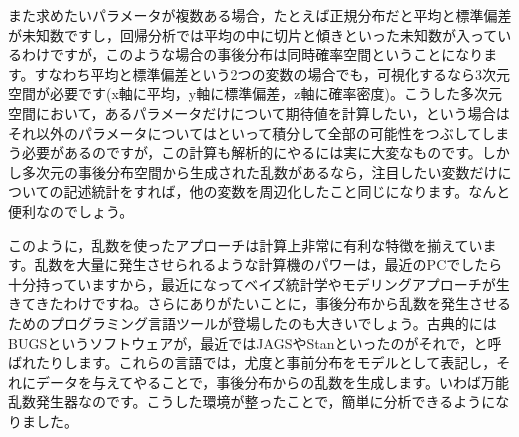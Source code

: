 \documentclass{ltjsbook}
\begin{document}
また求めたいパラメータが複数ある場合，たとえば正規分布だと平均と標準偏差が未知数ですし，回帰分析では平均の中に切片と傾きといった未知数が入っているわけですが，このような場合の事後分布は同時確率空間ということになります。すなわち平均と標準偏差という2つの変数の場合でも，可視化するなら3次元空間が必要です(x軸に平均，y軸に標準偏差，z軸に確率密度)。こうした多次元空間において，あるパラメータだけについて期待値を計算したい，という場合はそれ以外のパラメータについてはといって積分して全部の可能性をつぶしてしまう必要があるのですが，この計算も解析的にやるには実に大変なものです。しかし多次元の事後分布空間から生成された乱数があるなら，注目したい変数だけについての記述統計をすれば，他の変数を周辺化したこと同じになります。なんと便利なのでしょう。

このように，乱数を使ったアプローチは計算上非常に有利な特徴を揃えています。乱数を大量に発生させられるような計算機のパワーは，最近のPCでしたら十分持っていますから，最近になってベイズ統計学やモデリングアプローチが生きてきたわけですね。さらにありがたいことに，事後分布から乱数を発生させるためのプログラミング言語ツールが登場したのも大きいでしょう。古典的にはBUGSというソフトウェアが，最近ではJAGSやStanといったのがそれで，と呼ばれたりします。これらの言語では，尤度と事前分布をモデルとして表記し，それにデータを与えてやることで，事後分布からの乱数を生成します。いわば万能乱数発生器なのです。こうした環境が整ったことで，簡単に分析できるようになりました。
\end{document}
